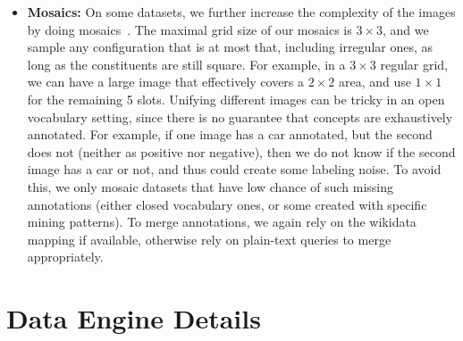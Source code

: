 \documentclass[]{fairmeta}
\begin{document}
\begin{itemize}
	\item \textbf{Mosaics:} On some datasets, we further increase the complexity of the images by doing mosaics~\citep{bochkovskiy2020yolov4optimalspeedaccuracy}. The maximal grid size of our mosaics is $3\times 3$, and we sample any configuration that is at most that, including irregular ones, as long as the constituents are still square. For example, in a $3\times 3$ regular grid, we can have a large image that effectively covers a $2\times 2$ area, and use $1\times 1$ for the remaining 5 slots. Unifying different images can be tricky in an open vocabulary setting, since there is no guarantee that concepts are exhaustively annotated. For example, if one image has a car annotated, but the second does not (neither as positive nor negative), then we do not know if the second image has a car or not, and thus could create some labeling noise. To avoid this, we only mosaic datasets that have low chance of such missing annotations (either closed vocabulary ones, or some created with specific mining patterns). To merge annotations, we again rely on the wikidata mapping if available, otherwise rely on plain-text queries to merge appropriately.
	
\end{itemize}

	






\section{Data Engine Details}
\label{app:sec:data-engine}
\end{document}
